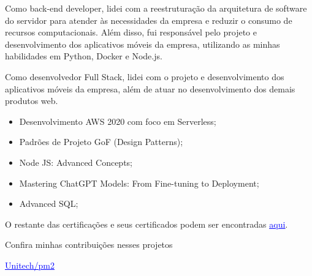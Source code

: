 \documentclass[10pt,a4paper,ragged2e,withhyper]{altacv}
\begin{document}
\begin{paracol}{2}
\divider

Como back-end developer, lidei com a reestruturação da arquitetura de software do servidor para atender às necessidades da empresa e reduzir o consumo de recursos computacionais. Além disso, fui responsável pelo projeto e desenvolvimento dos aplicativos móveis da empresa, utilizando as minhas habilidades em Python, Docker e Node.js.

\divider
\newpage
{}
Como desenvolvedor Full Stack, lidei com o projeto e desenvolvimento dos aplicativos móveis da empresa, além de atuar no desenvolvimento dos demais produtos web.


\medskip




\divider


\medskip



\begin{itemize}
  \item Desenvolvimento AWS 2020 com foco em Serverless;
  \item Padrões de Projeto GoF (Design Patterns);
  \item Node JS: Advanced Concepts;
  \item Mastering ChatGPT Models: From Fine-tuning to Deployment;
  \item Advanced SQL;
\end{itemize}

O restante das certificações e seus certificados podem ser encontradas \href{https://www.linkedin.com/in/agostini-willian/details/certifications/}{\textcolor{blue}{\underline{aqui}}}.

Confira minhas contribuições nesses projetos 

\href{https://github.com/Unitech/pm2/issues?q=commenter%3AWillianAgostini+}{\textcolor{blue}{\underline{Unitech/pm2}}}


\end{paracol}
\end{document}
